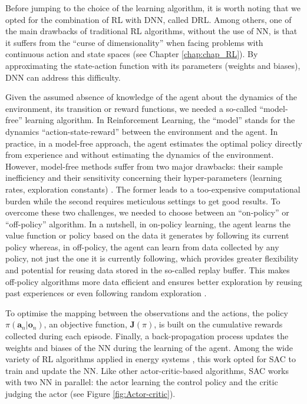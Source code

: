 Before jumping to the choice of the learning algorithm, it is worth noting that we opted for the combination of \gls{RL} with \gls{DNN}, called \gls{DRL}. Among others, one of the main drawbacks of traditional \gls{RL} algorithms, \ie without the use of \gls{NN},  is that it suffers from the ``curse of dimensionality'' when facing problems with continuous action and state spaces (see Chapter \ref{chap:chap_RL}). By approximating the state-action function with its parameters (\ie weights and biases), \gls{DNN} can address this difficulty. 

Given the assumed absence of knowledge of the agent about the dynamics of the environment, \ie its transition or reward functions, we needed a so-called ``model-free'' learning algorithm. In Reinforcement Learning, the ``model'' stands for the dynamics ``action-state-reward'' between the environment and the agent. In practice, in a model-free approach, the agent estimates the optimal policy directly from experience and without estimating the dynamics of the environment. However, model-free methods suffer from two major drawbacks: their sample inefficiency and their sensitivity concerning their hyper-parameters (\eg learning rates, exploration constants) \cite{haarnoja2018soft}. The former leads to a too-expensive computational burden while the second requires meticulous settings to get good results.  To overcome these two challenges, we needed to choose between an ``on-policy'' or ``off-policy'' algorithm. In a nutshell, in on-policy learning, the agent learns the value function or policy based on the data it generates by following its current policy whereas, in off-policy, the agent can learn from data collected by any policy, not just the one it is currently following, which provides greater flexibility and potential for reusing data stored in the so-called replay buffer. This makes off-policy algorithms more data efficient and ensures better exploration by reusing past experiences or even following random exploration \cite{haarnoja2018soft}.

To optimise the mapping between the observations and the actions, the policy $\pi\left(\bm{a}_n | \bm{o}_n\right)$, an objective function, $\bm{J}(\pi)$, is built on the cumulative rewards collected during each episode. Finally, a back-propagation process updates the weights and biases of the \gls{NN} during the learning of the agent. Among the wide variety of \gls{RL} algorithms applied in energy systems \cite{perera2021applications}, this work opted for \gls{SAC} \cite{haarnoja2018soft} to train and update the \gls{NN}.  Like other actor-critic-based algorithms, \gls{SAC} works with two \gls{NN} in parallel: the actor learning the control policy and the critic judging the actor (see Figure \ref{fig:Actor-critic}).

